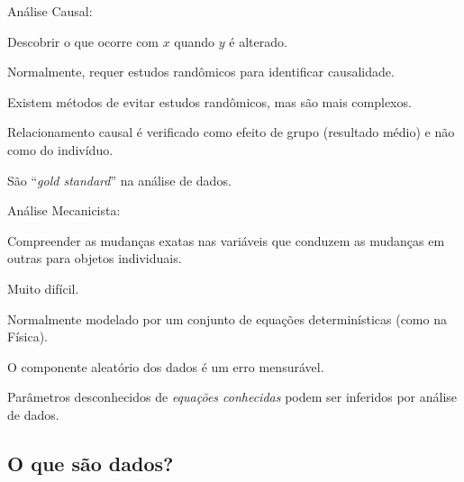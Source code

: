 \begin{multicols}{2}
\begin{nitemize}
\item Análise Causal:
  \begin{nitemize}
  \item Descobrir o que ocorre com $x$ quando $y$ é alterado.
  \item Normalmente, requer estudos randômicos para identificar causalidade.
  \item Existem métodos de evitar estudos randômicos, mas são mais complexos.
  \item Relacionamento causal é verificado como efeito de grupo (resultado médio) e não como do indivíduo.
  \item São ``\textit{gold standard}'' na análise de dados.
  \end{nitemize}
  
\item Análise Mecanicista:
  \begin{nitemize}
  \item Compreender as mudanças exatas nas variáveis que conduzem as mudanças em outras para objetos individuais.
  \item Muito difícil.
  \item Normalmente modelado por um conjunto de equações determinísticas (como na Física).
  \item O componente aleatório dos dados é um erro mensurável.
  \item Parâmetros desconhecidos de \emph{equações conhecidas} podem ser inferidos por análise de dados.
  \end{nitemize}
\end{nitemize}
\end{multicols}


\subsection{O que são dados?}

